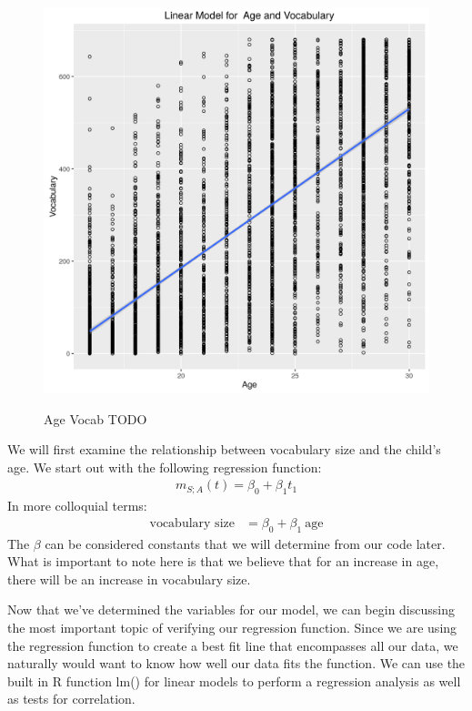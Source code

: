 \documentclass[11pt]{article}  %
\begin{document}
\begin{figure}[h]
\centering
\caption{Age Vocab TODO}
\includegraphics[scale=.50]{AgeVocab}
\label{fig:AVF}
\end{figure}

\indent We will first examine the relationship between vocabulary size and the child's age. We start out with the following regression function:
    \begin{align*}
        m_{S;A}(t) = \beta_0 + \beta_1 t_1
    \end{align*}
    In more colloquial terms:
    \begin{align*}
        \text{vocabulary size} &= \beta_0 + \beta_1\ \text{age}
    \end{align*}
\indent The $\beta$ can be considered constants that we will determine from our code later. What is important to note here is that we believe that for an increase in age, there will be an increase in vocabulary size.

\indent Now that we've determined the variables for our model, we can begin discussing the most important topic of verifying our regression function. Since we are using the regression function to create a best fit line that encompasses all our data, we naturally would want to know how well our data fits the function. We can use the built in R function lm() for linear models to perform a regression analysis as well as tests for correlation.
\end{document}
